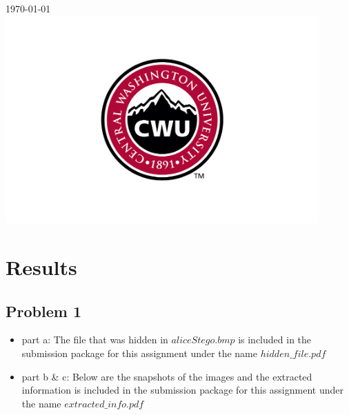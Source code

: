 \documentclass[12pt]{article}
\begin{document}
\begin{titlepage}
		
		
		{\large \today}\\ %
		
		
		\includegraphics[width=12cm]{CWU-Logo.png}\\[.5cm] %
		
		
		\vfill %
		
	\end{titlepage}
	\newpage
	\tableofcontents
	\newpage
	
	
	
	\section{Results}
		\subsection{Problem 1}
			\begin{itemize}
				\item part a: The file that was hidden in $aliceStego.bmp$ is included in the submission package for this assignment under the name $hidden\_file.pdf$
				\item part b \& c: Below are the snapshots of the images and the extracted information is included in the submission package for this assignment under the name $extracted\_info.pdf$
			\end{itemize}
			
\end{document}
